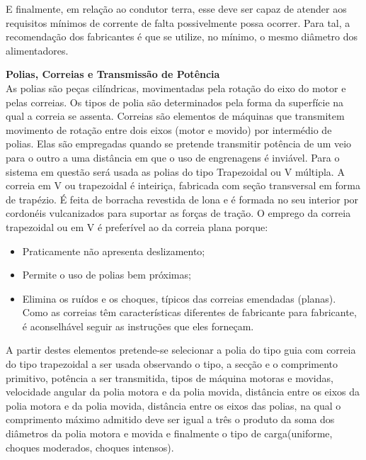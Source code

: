     E finalmente, em relação ao condutor terra, esse deve ser capaz de atender aos requisitos mínimos de corrente de falta possivelmente possa ocorrer. Para tal, a recomendação dos fabricantes é que se utilize, no mínimo, o mesmo diâmetro dos alimentadores.

    \textbf{Polias, Correias e Transmissão de Potência}\\
    As polias são peças cilíndricas, movimentadas pela rotação do eixo do motor e pelas correias. Os tipos de polia são determinados pela forma da superfície na qual a correia se assenta.
Correias são elementos de máquinas que transmitem movimento de rotação entre dois eixos (motor e movido) por intermédio de polias. Elas são empregadas quando se pretende transmitir potência de um veio para o outro a uma distância em que o uso de engrenagens é inviável.
Para o sistema em questão será usada as polias do tipo Trapezoidal ou V múltipla. A correia em V ou trapezoidal é inteiriça, fabricada com seção transversal em forma de trapézio. É feita de borracha revestida de lona e é formada no seu interior por cordonéis vulcanizados para suportar as forças de tração.
O emprego da correia trapezoidal ou em V é preferível ao da correia plana porque:

\begin{itemize}
  \item Praticamente não apresenta deslizamento;
  \item Permite o uso de polias bem próximas;
  \item Elimina os ruídos e os choques, típicos das correias emendadas (planas). Como as correias têm características diferentes de fabricante para fabricante, é aconselhável seguir as instruções que eles forneçam.
\end{itemize}

  A partir destes elementos pretende-se selecionar a polia do tipo guia com correia do tipo trapezoidal a ser usada observando o tipo, a secção e o comprimento primitivo, potência a ser transmitida, tipos de máquina motoras e  movidas, velocidade angular da polia motora e da polia movida, distância entre os eixos da polia motora e da polia movida, distância entre os eixos das polias, na qual o comprimento máximo admitido deve ser igual a três o produto da soma dos diâmetros da polia motora e movida e finalmente o tipo de carga(uniforme, choques moderados, choques intensos).

